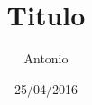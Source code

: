 \documentclass[a4paper,11pt]{article}
\begin{document}
\title{Titulo}
\author{Antonio}
\date{25/04/2016}
\maketitle
\end{document}

